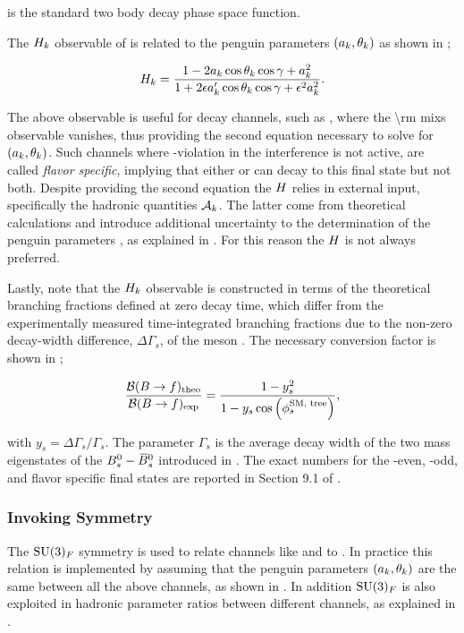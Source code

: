 \noindent is the standard two body decay phase space function.

The $H_{k}$ observable of  is related \cite{Fleischer:1999zi}
to the penguin parameters $(a_k,\theta_k)$ as shown in ;

\begin{equation}
\centering
  \Hobs{k} = \frac{1-2\akPeng\cos\thkPeng\cos\gamma + \akPeng^2}{1+2\epsilon\akPengPrime\cos\thkPeng\cos\gamma + \epsilon^2\akPeng^2}.
\label{Hobs_peng_param}
\end{equation}

\noindent The above observable is useful for decay channels, such as \BsJpsiKst, where the \Acp{\rm mix} observable vanishes,
thus providing the second equation necessary to solve for $(a_k,\theta_k)$. Such channels
where \CP-violation in the interference is not active, are called {\it flavor specific}, implying
that either \Bs or \Bsb can decay to this final state but not both.
Despite providing the second equation the $H_{}$ relies in external input, specifically the hadronic quantities $\mathcal{A}_{k}$.
The latter come from theoretical calculations and introduce additional uncertainty to the determination of the penguin parameters
, as explained in . For this reason the $H_{}$ is not always preferred.

Lastly, note that the $H_{k}$ observable is constructed in terms of the theoretical branching fractions
defined at zero decay time, which differ from the experimentally measured time-integrated branching fractions \cite{DeBruyn:2012wj}
due to the non-zero decay-width difference, $\Delta\Gamma_s$, of the \Bs meson \cite{hfag-2014}. The necessary conversion factor
is shown in ;

\begin{equation}
  \centering
  \frac{\BRof{\B\to f}_{\rm theo}}{\BRof{\B\to f}_{\rm exp}} = \frac{1-y_s^2}{1-y_s\cos\parenthesis{\phiS{\rm SM, tree}}},
  \label{br_conversion_formula}
\end{equation}

\noindent with $y_s = \Delta\Gamma_s / \Gamma_s$. The parameter $\Gamma_s$ is the average decay width of the two
mass eigenstates of the $B^0_s-\kern 0.18em\overline{\kern -0.18em B}{}^0_s$ introduced in . The exact numbers for the \CP-even,
\CP-odd, and flavor specific final states are reported in Section 9.1 of \cite{bsjpsikst-paper}.

\subsubsection{Invoking \grpsuthree Symmetry}
The $\mathrm{SU}(3)_{F}$ symmetry is used to relate channels like \BsJpsiKst and \BsJpsiRho to \BsJpsiPhi.
In practice this relation is implemented by assuming that the penguin parameters $(a_k,\theta_k)$
are the same between all the above channels, as shown in . In addition $\mathrm{SU}(3)_{F}$
is also exploited in hadronic parameter ratios between different channels, as explained in .
